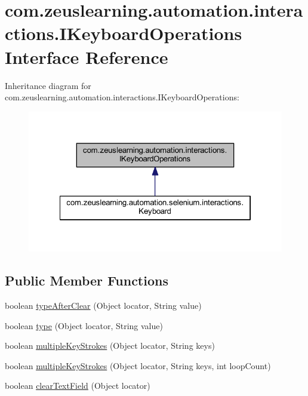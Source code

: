 \hypertarget{interfacecom_1_1zeuslearning_1_1automation_1_1interactions_1_1IKeyboardOperations}{}\section{com.\+zeuslearning.\+automation.\+interactions.\+I\+Keyboard\+Operations Interface Reference}
\label{interfacecom_1_1zeuslearning_1_1automation_1_1interactions_1_1IKeyboardOperations}


Inheritance diagram for com.\+zeuslearning.\+automation.\+interactions.\+I\+Keyboard\+Operations\+:\nopagebreak
\begin{figure}[H]
\begin{center}
\leavevmode
\includegraphics[width=322pt]{d0/da8/interfacecom_1_1zeuslearning_1_1automation_1_1interactions_1_1IKeyboardOperations__inherit__graph}
\end{center}
\end{figure}
\subsection*{Public Member Functions}
\begin{DoxyCompactItemize}
\item 
boolean \hyperlink{interfacecom_1_1zeuslearning_1_1automation_1_1interactions_1_1IKeyboardOperations_a81c4fed89a3f9c822db19bad8a948f6b}{type\+After\+Clear} (Object locator, String value)
\item 
boolean \hyperlink{interfacecom_1_1zeuslearning_1_1automation_1_1interactions_1_1IKeyboardOperations_a46786f6c5426cd849127eed9ba7192a7}{type} (Object locator, String value)
\item 
boolean \hyperlink{interfacecom_1_1zeuslearning_1_1automation_1_1interactions_1_1IKeyboardOperations_a4e070904ad56761bd97d494542833274}{multiple\+Key\+Strokes} (Object locator, String keys)
\item 
boolean \hyperlink{interfacecom_1_1zeuslearning_1_1automation_1_1interactions_1_1IKeyboardOperations_a8638a90fc1cc0d6f31b7bf8394299d66}{multiple\+Key\+Strokes} (Object locator, String keys, int loop\+Count)
\item 
boolean \hyperlink{interfacecom_1_1zeuslearning_1_1automation_1_1interactions_1_1IKeyboardOperations_adc477d38d61dc6aa4fc9c9749a20d773}{clear\+Text\+Field} (Object locator)
\end{DoxyCompactItemize}


